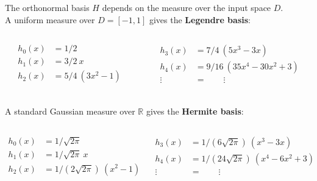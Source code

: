 \documentclass{beamer}
\begin{document}
\begin{frame}{}
The orthonormal basis $H$ depends on the measure over the input space $D$.\\ \vspace{3mm}
A uniform measure over $D=[-1,1]$ gives the \textbf{Legendre basis}:
\begin{columns}[c]
\begin{column}{4cm}
\begin{equation*}
  \begin{split}
    h_{0}(x) & = 1/2 \\
    h_{1}(x) & = 3/2\ x \\
    h_{2}(x) & = 5/4\ (3x^2 -1) \\
  \end{split}
\end{equation*}
\end{column}
\begin{column}{5cm}
\begin{equation*}
  \begin{split}
    h_{3}(x) & = 7/4\  (5x^3 - 3x) \\
    h_{4}(x) & = 9/16\  (35x^4 - 30x^2 + 3) \\
    \vdots \quad & = \qquad \vdots
  \end{split}
\end{equation*}
\end{column}
\end{columns} 
\vspace{3mm}
A standard Gaussian measure over $\mathds{R}$ gives the \textbf{Hermite basis}:
\begin{columns}[c]
\begin{column}{4cm}
\begin{equation*}
  \begin{split}
    h_{0}(x) & = 1/\sqrt{2 \pi} \\
    h_{1}(x) & = 1/\sqrt{2 \pi} \ x \\
    h_{2}(x) & = 1/(2\sqrt{2 \pi}) \ (x^2 - 1)  \\
  \end{split}
\end{equation*}
\end{column}
\begin{column}{5cm}
\begin{equation*}
  \begin{split}
    h_{3}(x) & = 1/(6\sqrt{2 \pi}) \ (x^3 - 3x) \\
    h_{4}(x) & = 1/(24\sqrt{2 \pi}) \ (x^4 - 6x^2 + 3) \\
    \vdots \quad & = \qquad \vdots
  \end{split}
\end{equation*}
\end{column}
\end{columns} 
\end{frame}
\end{document}
